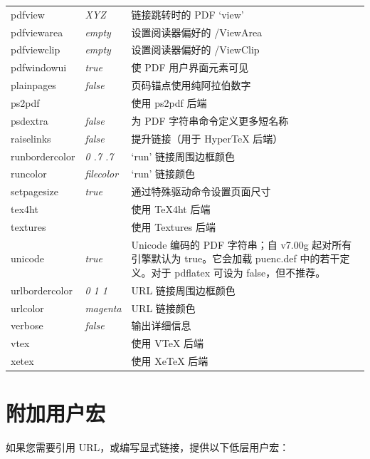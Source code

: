 \documentclass{article}
\begin{document}
\begin{longtable}{@{}>{\ttfamily}llp{7cm}@{}}
pdfview            & \textit{XYZ}           & 链接跳转时的 PDF `view'\\
pdfviewarea        & \textit{empty}         & 设置阅读器偏好的 /ViewArea\\
pdfviewclip        & \textit{empty}         & 设置阅读器偏好的 /ViewClip\\
pdfwindowui        & \textit{true}          & 使 PDF 用户界面元素可见\\
plainpages         & \textit{false}         & 页码锚点使用纯阿拉伯数字\\
ps2pdf             &                        & 使用 \textsf{ps2pdf} 后端\\
psdextra           & \textit{false}         & 为 PDF 字符串命令定义更多短名称\\
raiselinks         & \textit{false}         & 提升链接（用于 \textsf{Hyper\TeX} 后端）\\
runbordercolor     & \textit{0 .7 .7}       & `run' 链接周围边框颜色\\
runcolor           & \textit{filecolor}     & `run' 链接颜色\\
setpagesize        & \textit{true}          & 通过特殊驱动命令设置页面尺寸\\
tex4ht             &                        & 使用 \textsf{\TeX4ht} 后端\\
textures           &                        & 使用 \textsf{Textures} 后端\\
unicode            & \textit{true}          & Unicode 编码的 PDF 字符串；自 v7.00g 起对所有引擎默认为 true。它会加载 puenc.def 中的若干定义。对于 pdflatex 可设为 false，但不推荐。\\
urlbordercolor     & \textit{0 1 1}         & URL 链接周围边框颜色\\
urlcolor           & \textit{magenta}       & URL 链接颜色\\
verbose            & \textit{false}         & 输出详细信息\\
vtex               &                        & 使用 \textsf{VTeX} 后端\\
xetex              &                        & 使用 \textsf{Xe\TeX} 后端\\
\end{longtable}

\section{附加用户宏}

如果您需要引用 URL，或编写显式链接，提供以下低层用户宏：
\end{document}
